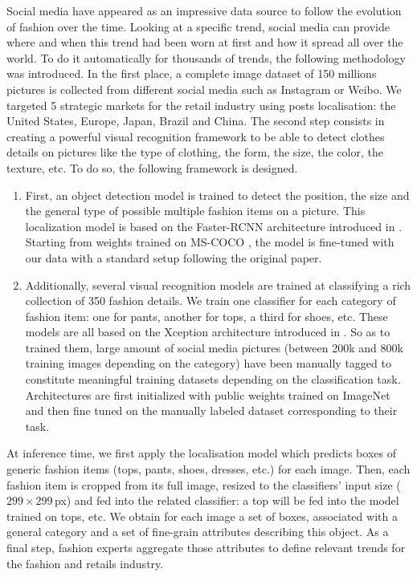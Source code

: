 \documentclass[10pt]{article} %
\begin{document}
Social media have appeared as an impressive data source to follow the evolution of fashion over the time. Looking at a specific trend, social media can provide where and when this trend had been worn at first and how it spread all over the world. To do it automatically for thousands of trends, the following methodology was introduced. In the first place, a complete image dataset of 150 millions pictures is collected from different social media such as Instagram or Weibo. We targeted 5 strategic markets for the retail industry using posts localisation: the United States, Europe, Japan, Brazil and China. 
The second step consists in creating a powerful visual recognition framework to be able to detect clothes details on pictures like the type of clothing, the form, the size, the color, the texture, etc. To do so, the following framework is designed.
\begin{enumerate}
    \item First, an object detection model is trained to detect the position, the size and the general type of possible multiple fashion items on a picture. This localization model is based on the Faster-RCNN architecture introduced in \citet{ren2015}. Starting from weights trained on MS-COCO \citep{lin2014}, the model is fine-tuned with our data with a standard setup following the original paper.
    \item  Additionally, several visual recognition models are trained at classifying a rich collection of 350 fashion details. We train one classifier for each category of fashion item: one for pants, another for tops, a third for shoes, etc. These models are all based on the Xception architecture introduced in \citet{chollet2017}. So as to trained them, large amount of social media pictures (between 200k and 800k training images depending on the category) have been manually tagged to constitute meaningful training datasets depending on the classification task. Architectures are first initialized with public weights trained on ImageNet \citep{russakovsky2014} and then fine tuned on the manually labeled dataset corresponding to their task.
\end{enumerate}

At inference time, we first apply the localisation model which predicts boxes of generic fashion items (tops, pants, shoes, dresses, etc.) for each image. Then, each fashion item is cropped from its full image, resized to the classifiers' input size ($299\times299\,$px) and fed into the related classifier: a top will be fed into the model trained on tops, etc. We obtain for each image a set of boxes, associated with a general category and a set of fine-grain attributes describing this object. As a final step, fashion experts aggregate those attributes to define relevant trends for the fashion and retails industry.
\end{document}
